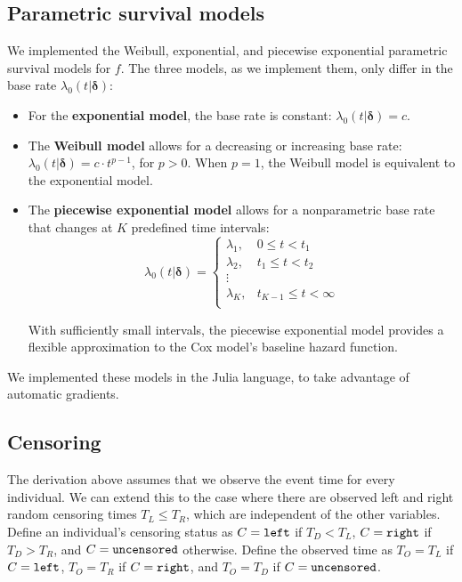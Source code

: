 \documentclass[12pt]{article}
\begin{document}
\subsection{Parametric survival models}
We implemented the Weibull, exponential, and piecewise exponential parametric survival models for $f$. The three models, as we implement them, only differ in the base rate $\lambda_0(t | \boldsymbol{\delta})$:
\begin{itemize}
    \item For the \textbf{exponential model}, the base rate is constant: $\lambda_0(t | \boldsymbol{\delta}) = c$. 
    \item The \textbf{Weibull model} allows for a decreasing or increasing base rate: $\lambda_0(t | \boldsymbol{\delta}) = c \cdot t ^ {p - 1}$, for $p > 0$. When $p=1$, the Weibull model is equivalent to the exponential model.
    \item The \textbf{piecewise exponential model} allows for a nonparametric base rate that changes at $K$ predefined time intervals:
    \[ 
    \lambda_0(t | \boldsymbol{\delta}) =
    \begin{cases}
        \lambda_1, & 0 \leq t < t_1 \\
        \lambda_2, & t_1 \leq t < t_2 \\
        \vdots \\
        \lambda_K, & t_{K-1} \leq t < \infty \\        
    \end{cases}
    \]    
    
    With sufficiently small intervals, the piecewise exponential model provides a flexible approximation to the Cox model’s baseline hazard function.
\end{itemize}

We implemented these models in the Julia language, to take advantage of automatic gradients.


\subsection{Censoring}\label{section:censoring}
The derivation above assumes that we observe the event time for every individual. We can extend this to the case where there are observed left and right random censoring times $T_L \leq T_R$, which are independent of the other variables. Define an individual's censoring status as $C = \tt{left}$ if $T_D<T_L$, $C = \tt{right}$ if $T_D>T_R$, and $C = \tt{uncensored}$ otherwise. Define the observed time as $T_O = T_L$ if $C = \tt{left}$, $T_O = T_R$ if $C = \tt{right}$, and $T_O = T_D$ if $C = \tt{uncensored}$.
\end{document}
